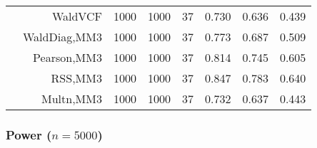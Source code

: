 \documentclass[
]{article}
\begin{document}
\begin{table}[H]
{\begin{tabular}[t]{lrrrrrrr}
\hspace{1em} & WaldVCF & 1000 & 1000 & 37 & 0.730 & 0.636 & 0.439\\

\hspace{1em} & WaldDiag,MM3 & 1000 & 1000 & 37 & 0.773 & 0.687 & 0.509\\

\hspace{1em} & Pearson,MM3 & 1000 & 1000 & 37 & 0.814 & 0.745 & 0.605\\

\hspace{1em} & RSS,MM3 & 1000 & 1000 & 37 & 0.847 & 0.783 & 0.640\\

\hspace{1em} & Multn,MM3 & 1000 & 1000 & 37 & 0.732 & 0.637 & 0.443\\
\bottomrule
\end{tabular}}
\endgroup{}
\end{table}

\subsubsection{\texorpdfstring{Power
(\(n=5000\))}{Power (n=5000)}}\label{power-n5000}
\end{document}
